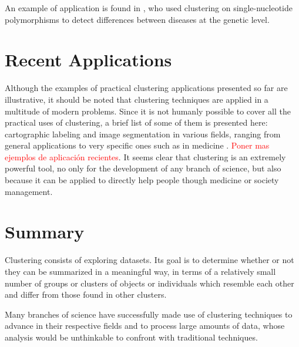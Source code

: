 An example of application is found in \cite{selinski2008cluster}, who used clustering on single-nucleotide polymorphisms to detect differences between diseases at the genetic level.

\section{Recent Applications}

Although the examples of practical clustering applications presented so far are illustrative, it should be noted that clustering techniques are applied in a multitude of modern problems. Since it is not humanly possible to cover all the practical uses of clustering, a brief list of some of them is presented here: cartographic labeling \cite{araujo2019improving} and image segmentation in various fields, ranging from general applications \cite{wang2018non} to very specific ones such as in medicine \cite{verma2016improved, aparajeeta2016modified}. \textcolor{red}{Poner mas ejemplos de aplicación recientes}. It seems clear that clustering is an extremely powerful tool, no only for the development of any branch of science, but also because it can be applied to directly help people though medicine or society management.

\section{Summary}

Clustering consists of exploring datasets. Its goal is to determine whether or not they can be summarized in a meaningful way, in terms of a relatively small number of groups or clusters of objects or individuals which resemble each other and differ from those found in other clusters.

Many branches of science have successfully made use of clustering techniques to advance in their respective fields and to process large amounts of data, whose analysis would be unthinkable to confront with traditional techniques.





















